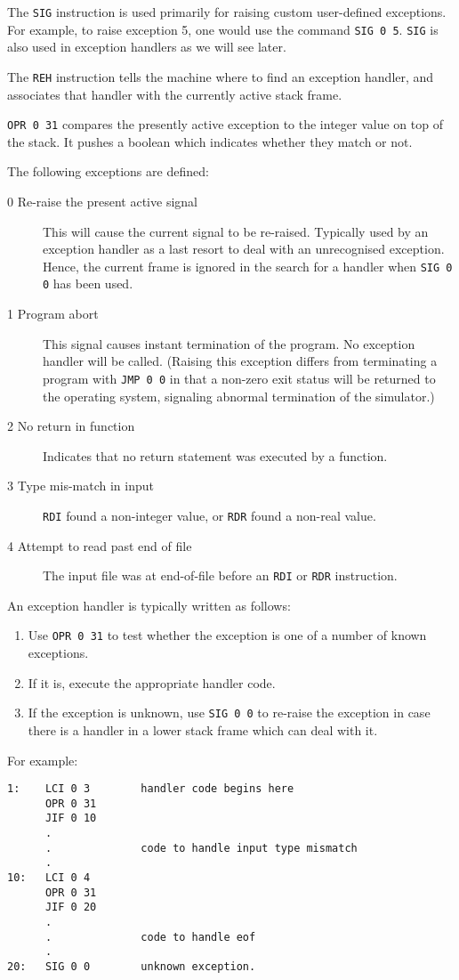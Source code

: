 \documentclass[a4paper,10pt]{report}
\begin{document}
The \texttt{SIG} instruction is used primarily for raising custom
user-defined exceptions.  For example, to raise exception 5, one would
use the command \texttt{SIG 0 5}.  \texttt{SIG} is also used in
exception handlers as we will see later.

The \texttt{REH} instruction tells the machine where to find an
exception handler, and associates that handler with the currently
active stack frame.

\texttt{OPR 0 31} compares the presently active exception to the
integer value on top of the stack.  It pushes a boolean which
indicates whether they match or not.

The following exceptions are defined:
\begin{description}
\item[0 Re-raise the present active signal] This will cause the
  current signal to be re-raised.  Typically used by an exception
  handler as a last resort to deal with an unrecognised exception.
  Hence, the current frame is ignored in the search for a handler when
  \texttt{SIG 0 0} has been used.
\item[1 Program abort] This signal causes instant termination of the
  program.  No exception handler will be called.  (Raising this
  exception differs from terminating a program with \texttt{JMP 0 0}
  in that a non-zero exit status will be returned to the operating
  system, signaling abnormal termination of the simulator.)
\item[2 No return in function] Indicates that no return statement was
  executed by a function.
\item[3 Type mis-match in input] \texttt{RDI} found a non-integer
  value, or \texttt{RDR} found a non-real value.
\item[4 Attempt to read past end of file] The input file was at
  end-of-file before an \texttt{RDI} or \texttt{RDR} instruction.
\end{description}

An exception handler is typically written as follows:
\begin{enumerate}
\item Use \texttt{OPR 0 31} to test whether the exception is one of a
  number of known exceptions.
\item If it is, execute the appropriate handler code.
\item If the exception is unknown, use \texttt{SIG 0 0} to re-raise
  the exception in case there is a handler in a lower stack frame
  which can deal with it.
\end{enumerate}
For example:
\begin{verbatim}
1:    LCI 0 3        handler code begins here
      OPR 0 31
      JIF 0 10  
      .
      .              code to handle input type mismatch
      .
10:   LCI 0 4
      OPR 0 31
      JIF 0 20
      .
      .              code to handle eof
      .
20:   SIG 0 0        unknown exception.
\end{verbatim}
\end{document}
